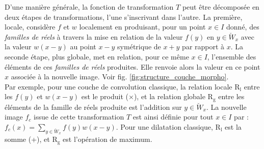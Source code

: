 \vspace{-1.6mm}
\noindent D'une manière générale, la fonction de transformation $T$ peut être décomposée en deux étapes de transformations, l’une s'inscrivant dans l’autre. La première, locale, considère $f$ et $w$ localement en produisant, pour un point $x \in I$ donné, des \textit{familles de réels} à travers la mise en relation de la valeur $f(y)$ en $y \in \breve{W}_x$ avec la valeur $w(x-y)$ au point $x-y$ symétrique de $x+y$ par rapport à $x$. La seconde étape, plus globale, met en relation, pour ce même $x \in I$, l'ensemble des éléments de ces \textit{familles de réels} produites. Elle renvoie alors la valeur en ce point $x$ associée à la nouvelle image. Voir fig. \ref{fig:structure_couche_morpho}. \\

\vspace{-1.6mm}
\noindent Par exemple, pour une couche de convolution classique, la relation locale $\text{R}_\text{l}$ entre les $f(y)$ et $w(x-y)$ est le produit ($\times$), et la relation globale $\text{R}_\text{g}$ entre les éléments de la famille de réels produite est l'addition sur $y \in \breve{W}_x$. La nouvelle image $f_c$ issue de cette transformation $T$ est ainsi définie pour tout $x \in I$ par : $f_c(x) = \sum_{y \in \breve{W}_x} f(y) w(x-y)$. Pour une dilatation classique, $\text{R}_\text{l}$ est la somme (+), et $\text{R}_\text{g}$ est l'opération de maximum.



